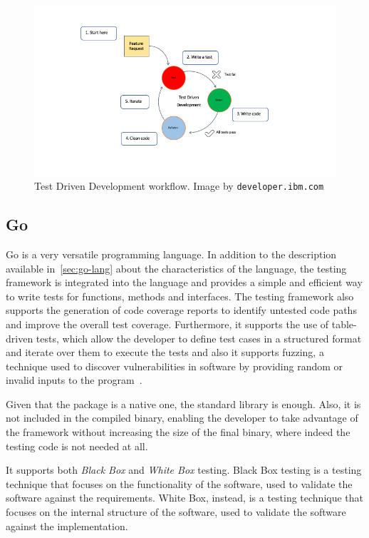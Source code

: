 \begin{figure}[ht]
  \centering
  \includegraphics[width=1.0\textwidth]{chapters/06/assets/tdd}
  \caption[Test Driven Development workflow]{Test Driven Development workflow. Image by \texttt{developer.ibm.com}}
  \label{fig:tdd}
\end{figure}

\subsection{Go}

Go is a very versatile programming language. In addition to the description available in~\cref{sec:go-lang} about the characteristics of the language, the testing framework is integrated into the language and provides a simple and efficient way to write tests for functions, methods and interfaces. The testing framework also supports the generation of code coverage reports to identify untested code paths and improve the overall test coverage. Furthermore, it supports the use of table-driven tests, which allow the developer to define test cases in a structured format and iterate over them to execute the tests and also it supports fuzzing, a technique used to discover vulnerabilities in software by providing random or invalid inputs to the program~\cite{go-package-testing}.

Given that the package is a native one, the standard library is enough. Also, it is not included in the compiled binary, enabling the developer to take advantage of the framework without increasing the size of the final binary, where indeed the testing code is not needed at all.

It supports both \textit{Black Box} and \textit{White Box} testing. Black Box testing is a testing technique that focuses on the functionality of the software, used to validate the software against the requirements. White Box, instead, is a testing technique that focuses on the internal structure of the software, used to validate the software against the implementation.

